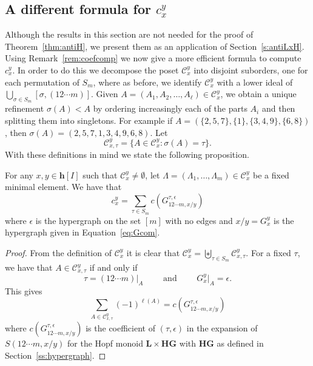 \documentclass[ALCO,ThmDefs,Unicode,epreuves]{cedram}
\newcommand{\bL}{\mathbf{L}}
\begin{document}
\subsection{A different formula for \texorpdfstring{$c_x^y$}{cxy}}\label{ss:antiHwithLxH} Although the results in this section are not needed for the proof of Theorem~\ref{thm:antiH}, we present them as an application of Section~\ref{s:antiLxH}.
Using Remark~\ref{rem:coefcomp} we now give a more efficient formula to compute
$c_x^y$. In order to do this we decompose the poset $\mathcal{C}_{x}^{y}$ into disjoint suborders, one for each permutation of $S_m$, 
where as before, we identify $\mathcal{C}_{x}^{y}$ with a lower ideal of $\bigcup_{\sigma\in S_m}[\sigma,(12\cdots m)]$.
Given $A=(A_1,A_2,\ldots,A_\ell)\in \mathcal{C}_{x}^{y}$, we obtain a unique refinement $\sigma(A)<A$ by ordering increasingly each of the parts $A_i$ and then splitting them into singletons. For example if $A=(\{2,5,7\},\{1\},\{3,4,9\},\{6,8\})$, then $\sigma(A)=(2,5,7,1,3,4,9,6,8)$.
Let
 $$\mathcal{C}_{x,\tau}^{y} = \big\{ A\in \mathcal{C}_{x}^{y} : \sigma(A)=\tau \big\}.$$
With these definitions in mind we state the following proposition.
\begin{prop}\label{lem:Cxydecomp} For any $x,y\in \mathbf{h}[I]$ such that $\mathcal{C}_{x}^{y}\ne\emptyset$, let $\Lambda=(\Lambda_1,\ldots,\Lambda_m)\in \mathcal{C}_{x}^{y}$ be a fixed minimal element. We have that
 $$ c_{x}^{y} = \sum_{\tau\in S_m} c(G_{12\cdots m,x/y}^{\tau,\epsilon}) $$
 where $\epsilon$ is the hypergraph on the set $[m]$ with no edges and $x/y=G_x^y$ is the hypergraph given in Equation~\eqref{eq:Gcom}.
\end{prop}

\begin{proof} From the definition of $\mathcal{C}_{x}^{y} $ it is clear that $\mathcal{C}_{x}^{y} = \biguplus_{\tau\in S_m} \mathcal{C}_{x,\tau}^{y}$. For a fixed $\tau$, we have that $A\in \mathcal{C}_{x,\tau}^{y}$ if and only if
 $$\tau=(12\cdots m)|_{A} \qquad \text{ and } \qquad G_x^y\big|_A=\epsilon.$$
This gives
 $$\sum_{A\in \mathcal{C}_{x,\tau}^{y}} (-1)^{\ell(A)} = c(G_{12\cdots m,x/y}^{\tau,\epsilon}) $$
where $c(G_{12\cdots m,x/y}^{\tau,\epsilon})$ is the coefficient of $(\tau,\epsilon)$ in the expansion of $S(12\cdots m,x/y)$ for the Hopf monoid ${\bL}\times \mathbf{HG}$ with $\mathbf{HG}$ as defined in Section~\ref{ss:hypergraph}.
\end{proof}
\end{document}
